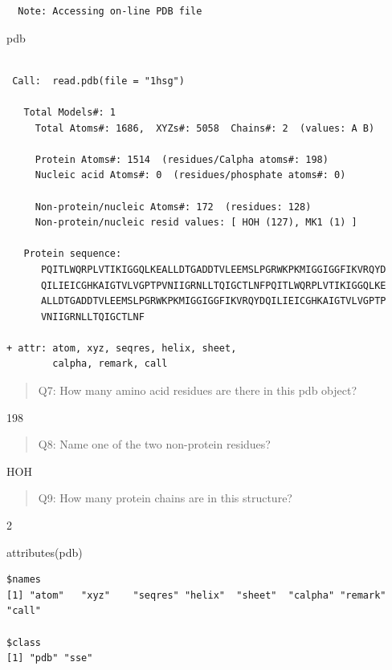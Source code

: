 \documentclass[
  letterpaper,
  DIV=11,
  numbers=noendperiod]{scrartcl}
\newenvironment{Shaded}{\begin{snugshade}}{\end{snugshade}}
\newcommand{\FunctionTok}[1]{\textcolor[rgb]{0.28,0.35,0.67}{#1}}
\newcommand{\NormalTok}[1]{\textcolor[rgb]{0.00,0.23,0.31}{#1}}
\begin{document}
\begin{verbatim}
  Note: Accessing on-line PDB file
\end{verbatim}

\begin{Shaded}
\begin{Highlighting}[]
\NormalTok{pdb}
\end{Highlighting}
\end{Shaded}

\begin{verbatim}

 Call:  read.pdb(file = "1hsg")

   Total Models#: 1
     Total Atoms#: 1686,  XYZs#: 5058  Chains#: 2  (values: A B)

     Protein Atoms#: 1514  (residues/Calpha atoms#: 198)
     Nucleic acid Atoms#: 0  (residues/phosphate atoms#: 0)

     Non-protein/nucleic Atoms#: 172  (residues: 128)
     Non-protein/nucleic resid values: [ HOH (127), MK1 (1) ]

   Protein sequence:
      PQITLWQRPLVTIKIGGQLKEALLDTGADDTVLEEMSLPGRWKPKMIGGIGGFIKVRQYD
      QILIEICGHKAIGTVLVGPTPVNIIGRNLLTQIGCTLNFPQITLWQRPLVTIKIGGQLKE
      ALLDTGADDTVLEEMSLPGRWKPKMIGGIGGFIKVRQYDQILIEICGHKAIGTVLVGPTP
      VNIIGRNLLTQIGCTLNF

+ attr: atom, xyz, seqres, helix, sheet,
        calpha, remark, call
\end{verbatim}

\begin{quote}
Q7: How many amino acid residues are there in this pdb object?
\end{quote}

198

\begin{quote}
Q8: Name one of the two non-protein residues?
\end{quote}

HOH

\begin{quote}
Q9: How many protein chains are in this structure?
\end{quote}

2

\begin{Shaded}
\begin{Highlighting}[]
\FunctionTok{attributes}\NormalTok{(pdb)}
\end{Highlighting}
\end{Shaded}

\begin{verbatim}
$names
[1] "atom"   "xyz"    "seqres" "helix"  "sheet"  "calpha" "remark" "call"  

$class
[1] "pdb" "sse"
\end{verbatim}
\end{document}
